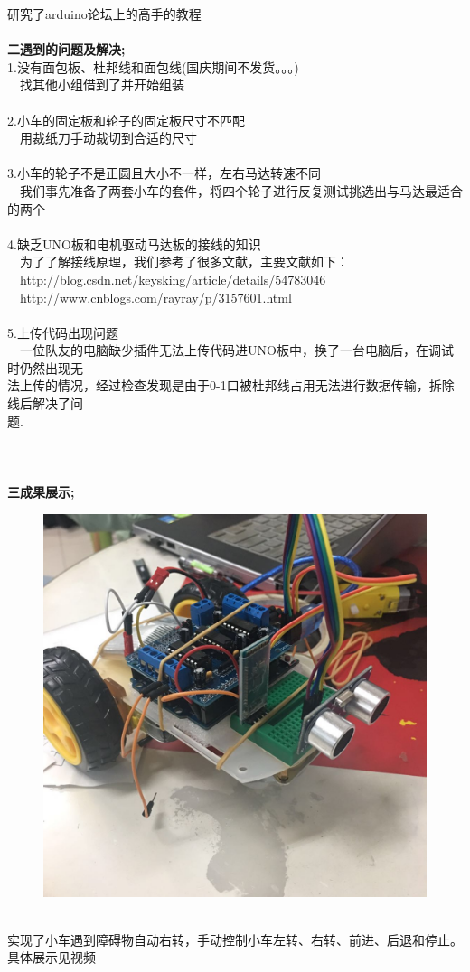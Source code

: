 \documentclass[19pt,a4paper]{article}
\begin{document}
\indent 研究了arduino论坛上的高手的教程
\\
\\
\indent\textbf{二\quad 遇到的问题及解决;}\\ 
\indent 1.没有面包板、杜邦线和面包线(国庆期间不发货。。。)\\
\indent\ \ 找其他小组借到了并开始组装 \\
\\
\indent 2.小车的固定板和轮子的固定板尺寸不匹配\\
\indent\ \ 用裁纸刀手动裁切到合适的尺寸\\
\\
\indent 3.小车的轮子不是正圆且大小不一样，左右马达转速不同\\
\indent\ \  我们事先准备了两套小车的套件，将四个轮子进行反复测试挑选出与马达最适合的两个\\
\\
\indent 4.缺乏UNO板和电机驱动马达板的接线的知识\\
\indent\ \ 为了了解接线原理，我们参考了很多文献，主要文献如下：\\
\indent\ \    http://blog.csdn.net/keysking/article/details/54783046\\
\indent\ \    http://www.cnblogs.com/rayray/p/3157601.html\\
\\
\indent 5.上传代码出现问题\\
\indent\ \ 一位队友的电脑缺少插件无法上传代码进UNO板中，换了一台电脑后，在调试时仍然出现无\\
\indent 法上传的情况，经过检查发现是由于0-1口被杜邦线占用无法进行数据传输，拆除线后解决了问\\
\indent 题.\\
\\
\\
\\
\indent\textbf{三\quad 成果展示;}\\
\begin{figure}[htbp]
 \centering
 \includegraphics[scale=0.2]{1.jpeg}
\end{figure}\\
\indent 实现了小车遇到障碍物自动右转，手动控制小车左转、右转、前进、后退和停止。\\
\indent 具体展示见视频\\
\end{document}
